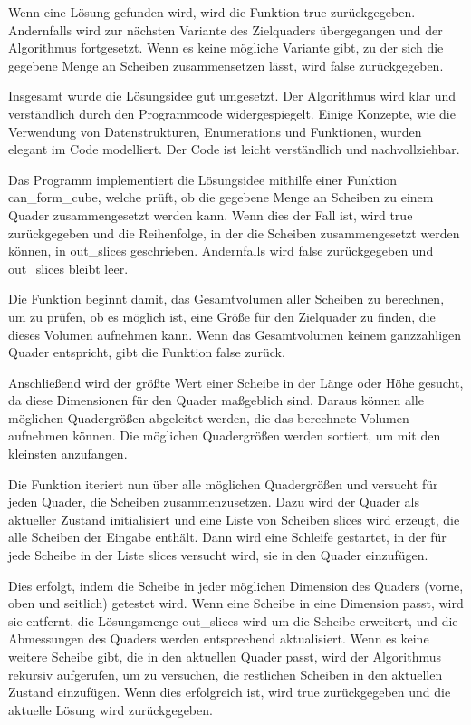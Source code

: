 \documentclass[a4paper,10pt,ngerman]{scrartcl}
\begin{document}
    Wenn eine Lösung gefunden wird, wird die Funktion true zurückgegeben.
    Andernfalls wird zur nächsten Variante des Zielquaders übergegangen und der Algorithmus fortgesetzt.
    Wenn es keine mögliche Variante gibt, zu der sich die gegebene Menge an Scheiben zusammensetzen lässt, wird false zurückgegeben.

    Insgesamt wurde die Lösungsidee gut umgesetzt.
    Der Algorithmus wird klar und verständlich durch den Programmcode widergespiegelt.
    Einige Konzepte, wie die Verwendung von Datenstrukturen, Enumerations und Funktionen, wurden elegant im Code modelliert.
    Der Code ist leicht verständlich und nachvollziehbar.


    Das Programm implementiert die Lösungsidee mithilfe einer Funktion can\_form\_cube, welche prüft, ob die gegebene Menge an Scheiben zu einem Quader zusammengesetzt werden kann.
    Wenn dies der Fall ist, wird true zurückgegeben und die Reihenfolge, in der die Scheiben zusammengesetzt werden können, in out\_slices geschrieben.
    Andernfalls wird false zurückgegeben und out\_slices bleibt leer.

    Die Funktion beginnt damit, das Gesamtvolumen aller Scheiben zu berechnen, um zu prüfen, ob es möglich ist, eine Größe für den Zielquader zu finden, die dieses Volumen aufnehmen kann.
    Wenn das Gesamtvolumen keinem ganzzahligen Quader entspricht, gibt die Funktion false zurück.

    Anschließend wird der größte Wert einer Scheibe in der Länge oder Höhe gesucht, da diese Dimensionen für den Quader maßgeblich sind.
    Daraus können alle möglichen Quadergrößen abgeleitet werden, die das berechnete Volumen aufnehmen können.
    Die möglichen Quadergrößen werden sortiert, um mit den kleinsten anzufangen.

    Die Funktion iteriert nun über alle möglichen Quadergrößen und versucht für jeden Quader, die Scheiben zusammenzusetzen.
    Dazu wird der Quader als aktueller Zustand initialisiert und eine Liste von Scheiben slices wird erzeugt, die alle Scheiben der Eingabe enthält.
    Dann wird eine Schleife gestartet, in der für jede Scheibe in der Liste slices versucht wird, sie in den Quader einzufügen.

    Dies erfolgt, indem die Scheibe in jeder möglichen Dimension des Quaders (vorne, oben und seitlich) getestet wird.
    Wenn eine Scheibe in eine Dimension passt, wird sie entfernt, die Lösungsmenge out\_slices wird um die Scheibe erweitert, und die Abmessungen des Quaders werden entsprechend aktualisiert.
    Wenn es keine weitere Scheibe gibt, die in den aktuellen Quader passt, wird der Algorithmus rekursiv aufgerufen, um zu versuchen, die restlichen Scheiben in den aktuellen Zustand einzufügen.
    Wenn dies erfolgreich ist, wird true zurückgegeben und die aktuelle Lösung wird zurückgegeben.
\end{document}
